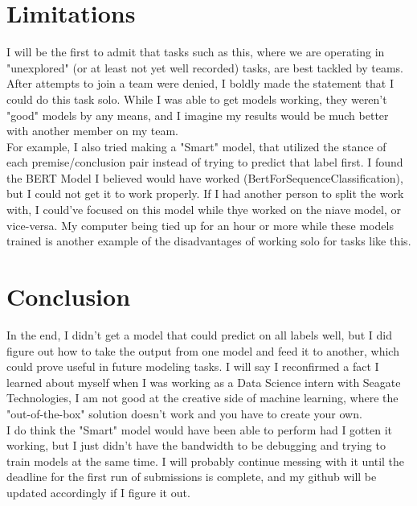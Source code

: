 \documentclass[11pt,a4paper]{article}
\begin{document}
\section{Limitations}
I will be the first to admit that tasks such as this, where we are operating in "unexplored" (or at least not yet 
well recorded) tasks, are best tackled by teams. After attempts to join a team were denied, I boldly made the statement
that I could do this task solo. While I was able to get models working, they weren't "good" models by any means, and
I imagine my results would be much better with another member on my team. \\
\indent For example, I also tried making a "Smart" model, that utilized the stance of each premise/conclusion pair
instead of trying to predict that label first. I found the BERT Model I believed would have worked 
(BertForSequenceClassification), but I could not get it to work properly. If I had another person to split the work 
with, I could've focused on this model while thye worked on the niave model, or vice-versa. My computer being tied 
up for an hour or more while these models trained is another example of the disadvantages of working solo for tasks
like this. 

\section{Conclusion}
In the end, I didn't get a model that could predict on all labels well, but I did figure out how to take the output from
one model and feed it to another, which could prove useful in future modeling tasks. I will say I reconfirmed a fact I learned
about myself when I was working as a Data Science intern with Seagate Technologies, I am not good at the creative side of
machine learning, where the "out-of-the-box" solution doesn't work and you have to create your own. \\
\indent I do think the "Smart" model would have been able to perform had I gotten it working, but I just didn't have the 
bandwidth to be debugging and trying to train models at the same time. I will probably continue messing with it until the 
deadline for the first run of submissions is complete, and my github will be updated accordingly if I figure it out. 
\end{document}
